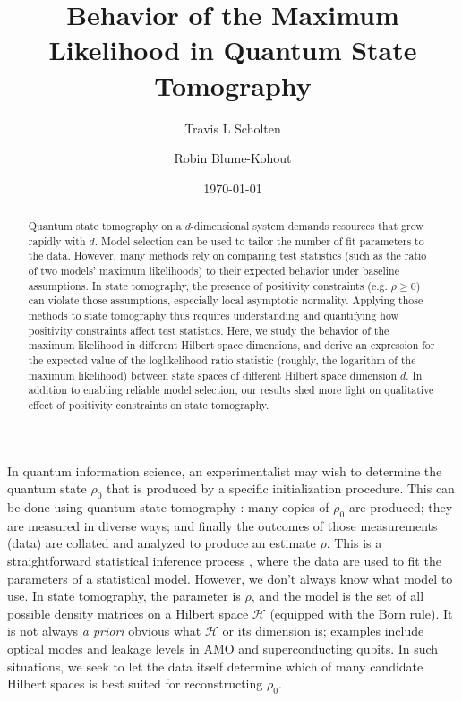 \documentclass[aps,pra, twocolumn]{revtex4-1}
\newcommand{\cH}{\mathcal{H}}
\newcommand{\rhohat}{\hat{\rho}}
\newcommand{\rhoMLE}{\rhohat_{\scriptscriptstyle\mathrm{MLE}}}
\newcommand{\rhoML}[1]{\rhohat_{\scriptscriptstyle{\mathrm{ML},#1}}}
\begin{document}
\author{Travis L Scholten}
\author{Robin Blume-Kohout}

\title{Behavior of the Maximum Likelihood in Quantum State Tomography}

\begin{abstract}
Quantum state tomography on a $d$-dimensional system demands resources that grow rapidly with $d$. Model selection can be used to tailor the number of fit parameters to the data.  However, many methods rely on comparing test statistics (such as the ratio of two models' maximum likelihoods) to their expected behavior under baseline assumptions.  In state tomography, the presence of positivity constraints (e.g. $\rho\geq0$) can violate those assumptions, especially local asymptotic normality.  Applying those methods to state tomography thus requires understanding and quantifying how positivity constraints affect test statistics.  Here, we study the behavior of the maximum likelihood in different Hilbert space dimensions, and derive an expression for the expected value of the loglikelihood ratio statistic (roughly, the logarithm of the maximum likelihood) between  state spaces of different Hilbert space dimension $d$.  In addition to enabling reliable model selection, our results shed more light on qualitative effect of positivity constraints on state tomography.
\end{abstract}
\date{\today}

\maketitle

\todo[inline]{General todo: replace $\rhoMLE$ by $\rhoML{}$}


 In quantum information science, an experimentalist may wish to determine the quantum state $\rho_{0}$ that is produced by a specific initialization procedure.  This can be done using quantum state tomography \cite{Paris2004}:  many copies of $\rho_{0}$ are produced; they are measured in diverse ways; and finally the outcomes of those measurements (data) are collated and analyzed to produce an estimate $\rhohat$.  This is a straightforward statistical inference process \cite{Reid2015, Wasserman2004}, where the data are used to fit the parameters of a statistical model.  However, we don't always know what model to use.  In state tomography, the parameter is $\rho$, and the model is the set of all possible density matrices on a Hilbert space $\cH$ (equipped with the Born rule). It is not always \emph{a priori} obvious what $\cH$ or its dimension is; examples include optical modes \cite{Altepeter2005, Bertrand1987, Lvovsky2009, Breitenbach1997, Leonhardt1995} and leakage levels in AMO and superconducting \cite{Motzoi2009, Fazio1999} qubits. In such situations, we seek to let the data itself determine which of many candidate Hilbert spaces is best suited for reconstructing $\rho_{0}$.
\end{document}

